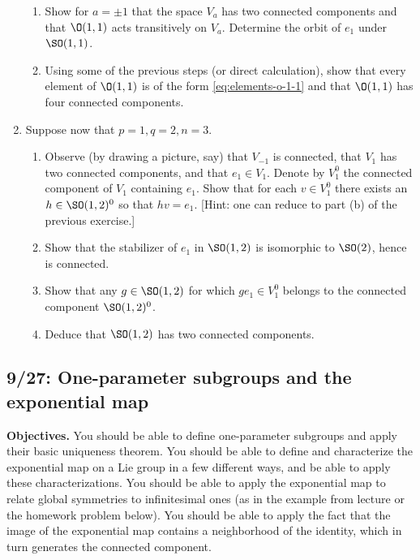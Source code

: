 \documentclass[reqno]{amsart} 
\begin{document}
\begin{homework}
\begin{enumerate}
\begin{enumerate}
    \item Show for $a = \pm 1$ that the space $V_a$ has two connected components and that $\O(1,1)$ acts transitively on $V_a$.  Determine the orbit of $e_1$ under $\SO(1,1)$.
    \item Using some of the previous steps (or direct calculation), show that every element of $\O(1,1)$ is of the form \eqref{eq:elements-o-1-1} and that $\O(1,1)$ has four connected components.
    \end{enumerate}
  \item Suppose now that $p = 1, q = 2, n = 3$.
    \begin{enumerate}
    \item Observe (by drawing a picture, say) that $V_{-1}$ is connected, that $V_{1}$ has two connected components, and that $e_1 \in V_{1}$.  Denote by $V_{1}^0$ the connected component of $V_{1}$ containing $e_1$.  Show that for each $v \in V_{1}^0$ there exists an $h \in \SO(1,2)^0$ so that $h v = e_1$.  [Hint: one can reduce to part (b) of the previous exercise.]
    \item Show that the stabilizer of $e_1$ in $\SO(1,2)$ is isomorphic to $\SO(2)$, hence is connected.
    \item Show that any $g \in \SO(1,2)$ for which $g e_1 \in V_{1}^0$ belongs to the connected component $\SO(1,2)^0$.
    \item Deduce that $\SO(1,2)$ has two connected components.
    \end{enumerate}
  \end{enumerate}
\end{homework}

\newpage
\subsection{9/27: One-parameter subgroups and the exponential map}
\label{sec:orge89327d}
\textbf{Objectives.} You should be able to define one-parameter subgroups and apply their basic uniqueness theorem.  You should be able to define and characterize the exponential map on a Lie group in a few different ways, and be able to apply these characterizations. You should be able to apply the exponential map to relate global symmetries to infinitesimal ones (as in the example from lecture or the homework problem below).  You should be able to apply the fact that the image of the exponential map contains a neighborhood of the identity, which in turn generates the connected component.
\end{document}
